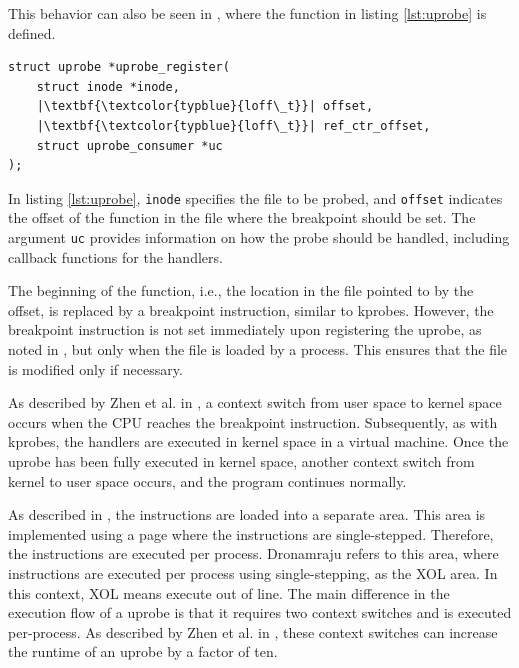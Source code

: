 This behavior can also be seen in \cite{uprobe_code}, where the function in listing \ref{lst:uprobe} is defined.  

\begin{listing}[H]
    \centering
\begin{verbatim}
struct uprobe *uprobe_register(
    struct inode *inode, 
    |\textbf{\textcolor{typblue}{loff\_t}}| offset, 
    |\textbf{\textcolor{typblue}{loff\_t}}| ref_ctr_offset, 
    struct uprobe_consumer *uc
);
\end{verbatim}
\caption{Function blueprint to register an Uprobe}
\label{lst:uprobe}
\end{listing}

In listing \ref{lst:uprobe}, \texttt{inode} specifies the file to be probed, and \texttt{offset} indicates the offset of the function in the file where the breakpoint should be set.  
The argument \texttt{uc} provides information on how the probe should be handled, including callback functions for the handlers.  

The beginning of the function, i.e., the location in the file pointed to by the offset, is replaced by a breakpoint instruction, similar to \acp{kprobe}.  
However, the breakpoint instruction is not set immediately upon registering the \ac{uprobe}, as noted in \cite{uprobe_mail}, but only when the file is loaded by a process.  
This ensures that the file is modified only if necessary.  

As described by Zhen et al. in \cite[p. 2, 3]{zheng2023bpftimeuserspaceebpfruntime}, a context switch from user space to kernel space occurs when the \ac{CPU} reaches the breakpoint instruction.  
Subsequently, as with \acp{kprobe}, the handlers are executed in kernel space in a virtual machine.  
Once the \ac{uprobe} has been fully executed in kernel space, another context switch from kernel to user space occurs, and the program continues normally.  

As described in \cite{uprobe_mail}, the instructions are loaded into a separate area.  
This area is implemented using a page where the instructions are single-stepped.  
Therefore, the instructions are executed per process.  
Dronamraju refers to this area, where instructions are executed per process using single-stepping, as the XOL area.
In this context, XOL means execute out of line.  
The main difference in the execution flow of a \ac{uprobe} is that it requires two context switches and is executed per-process.  
As described by Zhen et al. in \cite[p. 2]{zheng2023bpftimeuserspaceebpfruntime}, these context switches can increase the runtime of an \ac{uprobe} by a factor of ten.  

